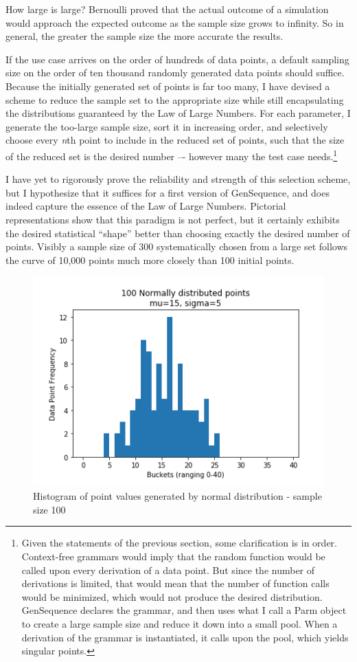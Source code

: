 How large is large? Bernoulli proved that the actual outcome of a simulation would approach the expected outcome as the sample size grows to infinity. So in general, the greater the sample size the more accurate the results.

If the use case arrives on the order of hundreds of data points, a default sampling size on the order of ten thousand randomly generated data points should suffice. Because the initially generated set of points is far too many, I have devised a scheme to reduce the sample set to the appropriate size while still encapsulating the distributions guaranteed by the Law of Large Numbers. For each parameter, I generate the too-large sample size, sort it in increasing order, and selectively choose every \textit{n}th point to include in the reduced set of points, such that the size of the reduced set is the desired number –-  however many the test case needs.\footnote{Given the statements of the previous section, some clarification is in order. Context-free grammars would imply that the random function would be called upon every derivation of a data point. But since the number of derivations is limited, that would mean that the number of function calls would be minimized, which would not produce the desired distribution. GenSequence declares the grammar, and then uses what I call a Parm object to create a large sample size and reduce it down into a small pool. When a derivation of the grammar is instantiated, it calls upon the pool, which yields singular points.}

I have yet to rigorously prove the reliability and strength of this selection scheme, but I hypothesize that it suffices for a first version of GenSequence, and does indeed capture the essence of the Law of Large Numbers. Pictorial representations show that this paradigm is not perfect, but it certainly exhibits the desired statistical ``shape'' better than choosing exactly the desired number of points. Visibly a sample size of 300 systematically chosen from a large set follows the curve of 10,000 points much more closely than 100 initial points.

\begin{figure}[H]
\centering
\includegraphics[scale=0.7]{law1.png}
\caption{Histogram of point values generated by normal distribution - sample size 100}
\label{fig:law1}
\end{figure}

